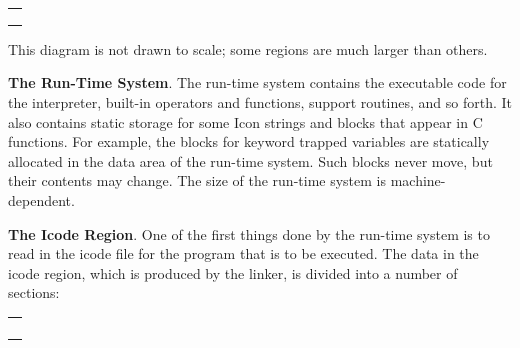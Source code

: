 \begin{center}
\tabletail{}
\tablelasttail{}
\begin{supertabular}{|m{2.30666in}|}
\hline
\centering{}\\\hline
\centering{}\\\hline
\centering{}\\\hline
\centering{}\\\hline
\end{supertabular}
\end{center}

This diagram is not drawn to scale; some regions are much larger than others.


\textbf{The Run-Time System}. The run-time system contains the
executable code for the interpreter, built-in operators and functions,
support routines, and so forth. It also contains static storage for
some Icon strings and blocks that appear in C functions. For example,
the blocks for keyword trapped variables are statically allocated in
the data area of the run-time system. Such blocks never move, but
their contents may change. The size of the run-time system is
machine-dependent.


\textbf{The Icode Region}. One of the first things done by the
run-time system is to read in the icode file for the program that is
to be executed. The data in the icode region, which is produced by the
linker, is divided into a number of sections:

\begin{center}
\tabletail{}
\tablelasttail{}
\begin{supertabular}{|m{2.2962599in}|}
\hline
\centering{}\\\hline
\centering{}\\\hline
\centering{}\\\hline
\centering{}\\\hline
\centering{}\\\hline
\end{supertabular}
\end{center}

